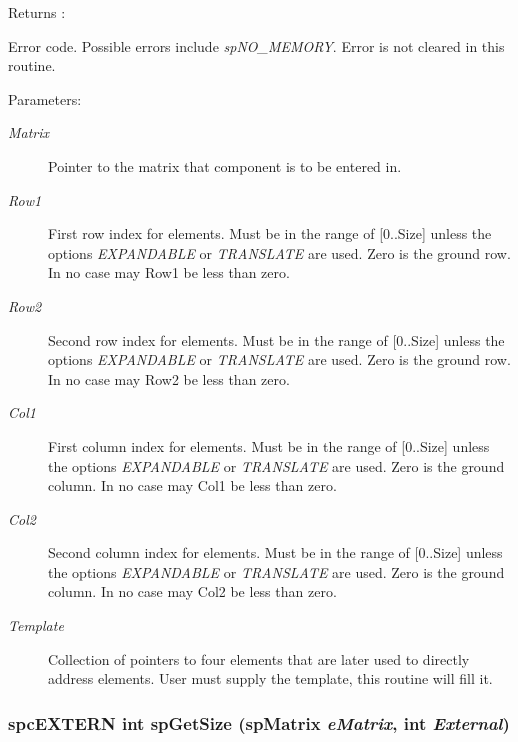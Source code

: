 \begin{Desc}
\item[Returns :]\par
 Error code. Possible errors include {\em sp\-NO\_\-MEMORY}. Error is not cleared in this routine.\end{Desc}
\begin{Desc}
\item[Parameters: ]\par
\begin{description}
\item[{\em 
Matrix}]Pointer to the matrix that component is to be entered in. \item[{\em 
Row1}]First row index for elements. Must be in the range of [0..Size] unless the options {\em EXPANDABLE} or {\em TRANSLATE} are used. Zero is the ground row. In no case may Row1 be less than zero. \item[{\em 
Row2}]Second row index for elements. Must be in the range of [0..Size] unless the options {\em EXPANDABLE} or {\em TRANSLATE} are used. Zero is the ground row. In no case may Row2 be less than zero. \item[{\em 
Col1}]First column index for elements. Must be in the range of [0..Size] unless the options {\em EXPANDABLE} or {\em TRANSLATE} are used. Zero is the ground column. In no case may Col1 be less than zero. \item[{\em 
Col2}]Second column index for elements. Must be in the range of [0..Size] unless the options {\em EXPANDABLE} or {\em TRANSLATE} are used. Zero is the ground column. In no case may Col2 be less than zero. \item[{\em 
Template}]Collection of pointers to four elements that are later used to directly address elements. User must supply the template, this routine will fill it. \end{description}
\end{Desc}
\subsubsection{\setlength{\rightskip}{0pt plus 5cm}spc\-EXTERN int sp\-Get\-Size ({\bf sp\-Matrix} {\em e\-Matrix}, int {\em External})}\label{spMatrix_8h_a40}


